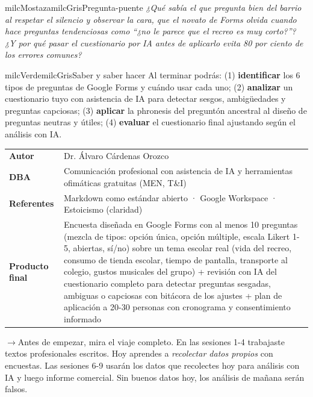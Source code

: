 \documentclass[11pt,letterpaper]{article}
\newcommand{\puente}[1]{%
  \begin{puentebox}%
    \textcolor{milcGradeDark}{$\rightarrow$}\hspace{2mm}#1%
  \end{puentebox}%
}
\begin{document}
\begin{softbox}{milcMostaza}{milcGris}{Pregunta-puente}
\textit{¿Qué sabía el que pregunta bien del barrio al respetar el silencio y observar la cara, que el novato de Forms olvida cuando hace preguntas tendenciosas como \emph{``¿no le parece que el recreo es muy corto?''}? ¿Y por qué pasar el cuestionario por IA antes de aplicarlo evita 80 por ciento de los errores comunes?}
\end{softbox}

\begin{softbox}{milcVerde}{milcGris}{Saber y saber hacer}
Al terminar podrás: (1) \textbf{identificar} los 6 tipos de preguntas de Google Forms y cuándo usar cada uno; (2) \textbf{analizar} un cuestionario tuyo con asistencia de IA para detectar sesgos, ambigüedades y preguntas capciosas; (3) \textbf{aplicar} la phronesis del preguntón ancestral al diseño de preguntas neutras y útiles; (4) \textbf{evaluar} el cuestionario final ajustando según el análisis con IA.
\end{softbox}



\small
\begin{tabularx}{\textwidth}{>{\bfseries}p{3.0cm}Y}
Autor & Dr. Álvaro Cárdenas Orozco\\
DBA & Comunicación profesional con asistencia de IA y herramientas ofimáticas gratuitas (MEN, T\&I)\\
Referentes & Markdown como estándar abierto · Google Workspace · Estoicismo (claridad)\\
Producto final & Encuesta diseñada en Google Forms con al menos 10 preguntas (mezcla de tipos: opción única, opción múltiple, escala Likert 1-5, abiertas, sí/no) sobre un tema escolar real (vida del recreo, consumo de tienda escolar, tiempo de pantalla, transporte al colegio, gustos musicales del grupo) + revisión con IA del cuestionario completo para detectar preguntas sesgadas, ambiguas o capciosas con bitácora de los ajustes + plan de aplicación a 20-30 personas con cronograma y consentimiento informado\\
\end{tabularx}
\normalsize

\puente{Antes de empezar, mira el viaje completo. En las sesiones 1-4 trabajaste textos profesionales escritos. Hoy aprendes a \emph{recolectar datos propios} con encuestas. Las sesiones 6-9 usarán los datos que recolectes hoy para análisis con IA y luego informe comercial. Sin buenos datos hoy, los análisis de mañana serán falsos.}
\end{document}
